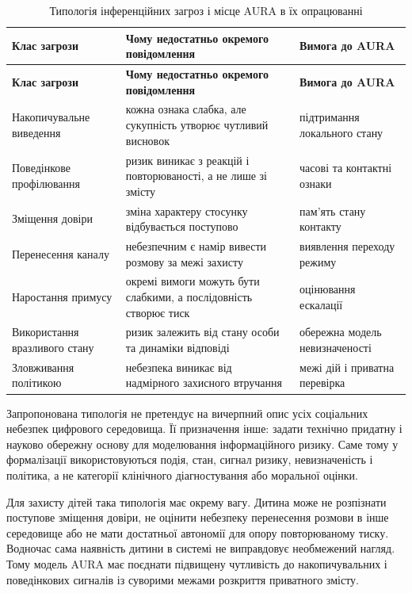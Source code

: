 \begin{longtable}{p{3.5cm} p{4.9cm} p{4.0cm}}
\caption{Типологія інференційних загроз і місце AURA в їх опрацюванні}
\label{tab:inference-threats}\\
\toprule
\textbf{Клас загрози} & \textbf{Чому недостатньо окремого повідомлення} & \textbf{Вимога до AURA} \\
\midrule
\endfirsthead
\toprule
\textbf{Клас загрози} & \textbf{Чому недостатньо окремого повідомлення} & \textbf{Вимога до AURA} \\
\midrule
\endhead
Накопичувальне виведення & кожна ознака слабка, але сукупність утворює чутливий висновок & підтримання локального стану \\
Поведінкове профілювання & ризик виникає з реакцій і повторюваності, а не лише зі змісту & часові та контактні ознаки \\
Зміщення довіри & зміна характеру стосунку відбувається поступово & пам'ять стану контакту \\
Перенесення каналу & небезпечним є намір вивести розмову за межі захисту & виявлення переходу режиму \\
Наростання примусу & окремі вимоги можуть бути слабкими, а послідовність створює тиск & оцінювання ескалації \\
Використання вразливого стану & ризик залежить від стану особи та динаміки відповіді & обережна модель невизначеності \\
Зловживання політикою & небезпека виникає від надмірного захисного втручання & межі дій і приватна перевірка \\
\bottomrule
\end{longtable}

Запропонована типологія не претендує на вичерпний опис усіх соціальних небезпек цифрового середовища. Її призначення інше: задати технічно придатну і науково обережну основу для моделювання інформаційного ризику. Саме тому у формалізації використовуються подія, стан, сигнал ризику, невизначеність і політика, а не категорії клінічного діагностування або моральної оцінки.

Для захисту дітей така типологія має окрему вагу. Дитина може не розпізнати поступове зміщення довіри, не оцінити небезпеку перенесення розмови в інше середовище або не мати достатньої автономії для опору повторюваному тиску. Водночас сама наявність дитини в системі не виправдовує необмежений нагляд. Тому модель AURA має поєднати підвищену чутливість до накопичувальних і поведінкових сигналів із суворими межами розкриття приватного змісту.

